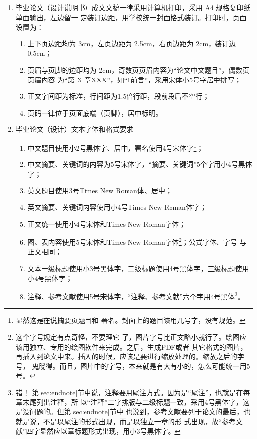 \documentclass{swfuthesis}
\begin{document}
\begin{enumerate}
\item 毕业论文（设计说明书）成文文稿一律采用计算机打印，采用 A4 规格复印纸单面输出，左边留一
  定装订边距，用学校统一封面格式装订。打印时，页面设置为：
  \begin{enumerate}
  \item 上下页边距均为 3cm，左页边距为 2.5cm，右页边距为 2cm，装订边 0.5cm；
  \item 页眉与页脚的边距均为 2cm，奇数页页眉内容为“论文中文题目”，偶数页页眉内容
    为“第 X 章\hspace{1ex}XXX”，如“1\hspace{1ex}前言”，采用宋体小5号字居中排写；
  \item 正文字间距为标准，行间距为1.5倍行距，段前段后不空行；
  \item 页码一律位于页面底端（页脚），居中标明。
  \end{enumerate}
\item 毕业论文（设计）文本字体和格式要求
  \begin{enumerate}
  \item 中文题目使用小2号黑体字、居中，署名使用4号宋体字\footnote{显然这是在说摘要页题目和
      署名。封面上的题目该用几号字，没有规范。}；
  \item 中文摘要、关键词的内容为5号宋体字，“摘要、关键词”5个字用小4号黑体字；
  \item 英文题目使用3号Times New Roman体、居中；
  \item 英文摘要、关键词内容使用小4号Times New Roman体字；
  \item 正文统一使用小4号宋体和Times New Roman字体；
  \item 图、表内容使用5号宋体和Times New Roman字体{\wrong}\footnote{这个字号规定有点奇怪，不要理它
      了，图片字号比正文略小就行了。绘图应该用独立、专用的绘图软件来完成。之后，生成PDF或者
      其它格式的图片，再插入到论文中来。插入的时候，应该是要进行缩放处理的。缩放之后的字号，
      鬼晓得。而且，图片中的字号，本来就是有大有小的，怎么可能统一用5号。}；公式字体、字号
    与正文相同；
  \item 文本一级标题使用小3号黑体字，二级标题使用4号黑体字，三级标题使用小4号黑体字；
  \item 注释、参考文献使用5号宋体字，“注释、参考文献”六个字用4号黑体{\wrong}\footnote{错！
      第\ref{sec:endnote}节中说，注释要用尾注方式。因为是“尾注”，也就是在每章末尾列出注释，所
      以“注释”二字排版与二级标题一致，采用4号黑体字，这是没问题的。但第\ref{sec:endnote}节中
      也说到，参考文献要列于论文的最后，也就是说，不是以尾注的形式出现，而是以独立一章的形
      式出现，故“参考文献”四字显然应以章标题形式出现，用小3号黑体字。}。
  \end{enumerate}
\end{enumerate}
\end{document}
